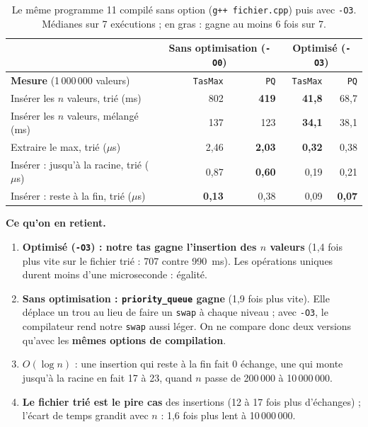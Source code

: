 \documentclass[11pt,a4paper]{article}
\begin{document}
\begin{table}[H]
\centering
\small
\begin{tabular}{|l|r|r|r|r|}
\hline
& \multicolumn{2}{c|}{\textbf{Sans optimisation} (\texttt{-O0})} & \multicolumn{2}{c|}{\textbf{Optimisé} (\texttt{-O3})} \\
\hline
\textbf{Mesure} (1\,000\,000 valeurs) & \texttt{TasMax} & \texttt{PQ} & \texttt{TasMax} & \texttt{PQ} \\
\hline
Insérer les $n$ valeurs, trié (ms)        & 802          & \textbf{419}  & \textbf{41,8} & 68,7 \\
\hline
Insérer les $n$ valeurs, mélangé (ms)     & 137          & 123           & \textbf{34,1} & 38,1 \\
\hline
Extraire le max, trié ($\mu$s)            & 2,46         & \textbf{2,03} & \textbf{0,32} & 0,38 \\
\hline
Insérer : jusqu'à la racine, trié ($\mu$s)& 0,87         & \textbf{0,60} & 0,19          & 0,21 \\
\hline
Insérer : reste à la fin, trié ($\mu$s)   & \textbf{0,13}& 0,38          & 0,09          & \textbf{0,07} \\
\hline
\end{tabular}
\caption{Le même programme 11 compilé sans option (\texttt{g++ fichier.cpp}) puis avec
\texttt{-O3}. Médianes sur 7 exécutions ; en gras : gagne au moins 6 fois sur 7.}
\end{table}

\textbf{Ce qu'on en retient.}
\begin{enumerate}
  \item \textbf{Optimisé (\texttt{-O3}) : notre tas gagne l'insertion des $n$ valeurs}
        (1,4 fois plus vite sur le fichier trié : 707 contre 990~ms). Les opérations uniques
        durent moins d'une microseconde : égalité.
  \item \textbf{Sans optimisation : \texttt{priority\_queue} gagne} (1,9 fois plus vite).
        Elle déplace un \og trou \fg{} au lieu de faire un \texttt{swap} à chaque niveau ;
        avec \texttt{-O3}, le compilateur rend notre \texttt{swap} aussi léger. On ne compare
        donc deux versions qu'avec les \textbf{mêmes options de compilation}.
  \item \textbf{$O(\log n)$} : une insertion qui reste à la fin fait 0 échange, une qui monte
        jusqu'à la racine en fait 17 à 23, quand $n$ passe de 200\,000 à 10\,000\,000.
  \item \textbf{Le fichier trié est le pire cas} des insertions (12 à 17 fois plus
        d'échanges) ; l'écart de temps grandit avec $n$ : 1,6 fois plus lent à 10\,000\,000.
\end{enumerate}
\end{document}
